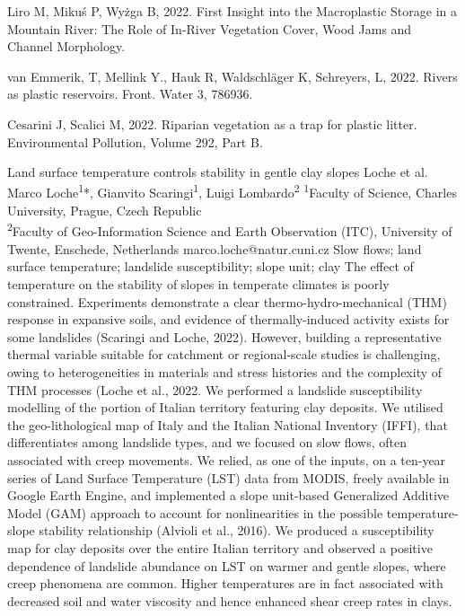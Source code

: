 {Liro M, Mikuś P, Wyżga B, 2022. First Insight into the Macroplastic Storage in a Mountain River: The Role of In-River Vegetation Cover, Wood Jams and Channel Morphology. 

van Emmerik, T, Mellink Y., Hauk R, Waldschläger K, Schreyers, L, 2022. Rivers as plastic reservoirs. Front. Water 3, 786936. 

Cesarini J, Scalici M, 2022. Riparian vegetation as a trap for plastic litter. Environmental Pollution, Volume 292, Part B. 
}

\abstract
{Land surface temperature controls stability in gentle clay slopes} 
{Loche et al.} 
{Marco Loche\textsuperscript{1}*, Gianvito Scaringi\textsuperscript{1}, Luigi Lombardo\textsuperscript{2}} 
{\TLtag} 
{
\textsuperscript{1}Faculty of Science, Charles University, Prague, Czech Republic\\
\textsuperscript{2}Faculty of Geo-Information Science and Earth Observation (ITC), University of Twente, Enschede, Netherlands
}
{marco.loche@natur.cuni.cz}  %
{Slow flows; land surface temperature; landslide susceptibility; slope unit; clay}
{The effect of temperature on the stability of slopes in temperate climates is poorly constrained. Experiments demonstrate a clear thermo-hydro-mechanical (THM) response in expansive soils, and evidence of thermally-induced activity exists for some landslides (Scaringi and Loche, 2022). However, building a representative thermal variable suitable for catchment or regional-scale studies is challenging, owing to heterogeneities in materials and stress histories and the complexity of THM processes (Loche et al., 2022. We performed a landslide susceptibility modelling of the portion of Italian territory featuring clay deposits. We utilised the geo-lithological map of Italy and the Italian National Inventory (IFFI), that differentiates among landslide types, and we focused on slow flows, often associated with creep movements. We relied, as one of the inputs, on a ten-year series of Land Surface Temperature (LST) data from MODIS, freely available in Google Earth Engine, and implemented a slope unit-based Generalized Additive Model (GAM) approach to account for nonlinearities in the possible temperature-slope stability relationship (Alvioli et al., 2016). We produced a susceptibility map for clay deposits over the entire Italian territory and observed a positive dependence of landslide abundance on LST on warmer and gentle slopes, where creep phenomena are common. Higher temperatures are in fact associated with decreased soil and water viscosity and hence enhanced shear creep rates in clays.
}
